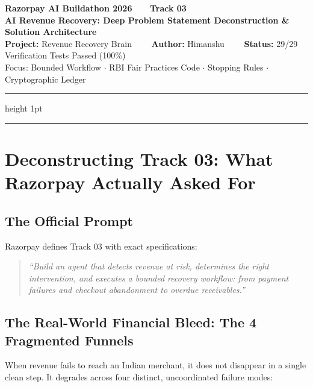 \documentclass[11pt, a4paper]{article}
\begin{document}
\begin{center}
  {\LARGE\bfseries\color{razorblue} Razorpay AI Buildathon 2026 \ \textbar\ \ Track 03}\\[6pt]
  {\Large\bfseries\color{primaryblue} AI Revenue Recovery: Deep Problem Statement Deconstruction \& Solution Architecture}\\[8pt]
  {\normalsize\textbf{Project:} Revenue Recovery Brain \ \ \textbar\ \ \textbf{Author:} Himanshu \ \ \textbar\ \ \textbf{Status:} 29/29 Verification Tests Passed (100\%)}\\[2pt]
  {\footnotesize\color{gray} Focus: Bounded Workflow $\cdot$ RBI Fair Practices Code $\cdot$ Stopping Rules $\cdot$ Cryptographic Ledger}
\end{center}
\vspace{-4pt}
\hrule height 1pt
\vspace{10pt}

\tableofcontents
\vspace{12pt}
\hrule
\vspace{14pt}

\section{Deconstructing Track 03: What Razorpay Actually Asked For}

\subsection{The Official Prompt}
Razorpay defines Track 03 with exact specifications:
\begin{quote}
\textit{``Build an agent that detects revenue at risk, determines the right intervention, and executes a bounded recovery workflow: from payment failures and checkout abandonment to overdue receivables.''}
\end{quote}

\subsection{The Real-World Financial Bleed: The 4 Fragmented Funnels}
When revenue fails to reach an Indian merchant, it does not disappear in a single clean step. It degrades across four distinct, uncoordinated failure modes:
\end{document}
